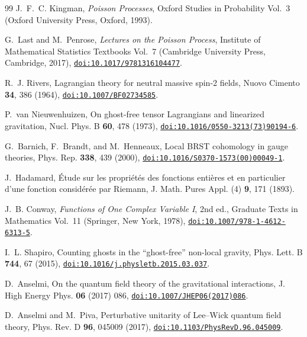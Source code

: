 \documentclass[aps,prd,10pt,twocolumn,superscriptaddress,nofootinbib,floatfix,longbibliography,showpacs,showkeys]{revtex4-2}
\theoremstyle{plain}
\theoremstyle{definition}
\theoremstyle{remark}
\begin{document}
\begin{thebibliography}{99}
J.~F.~C. Kingman, \emph{Poisson Processes}, Oxford Studies in Probability Vol.~3 (Oxford University Press, Oxford, 1993).

G.~Last and M.~Penrose, \emph{Lectures on the Poisson Process}, Institute of Mathematical Statistics Textbooks Vol.~7 (Cambridge University Press, Cambridge, 2017), \href{https://doi.org/10.1017/9781316104477}{\nolinkurl{doi:10.1017/9781316104477}}.

R.~J. Rivers, Lagrangian theory for neutral massive spin-2 fields, Nuovo Cimento \textbf{34}, 386 (1964), \href{https://doi.org/10.1007/BF02734585}{\nolinkurl{doi:10.1007/BF02734585}}.

P.~van Nieuwenhuizen, On ghost-free tensor Lagrangians and linearized gravitation, Nucl. Phys. B \textbf{60}, 478 (1973), \href{https://doi.org/10.1016/0550-3213(73)90194-6}{\nolinkurl{doi:10.1016/0550-3213(73)90194-6}}.

G.~Barnich, F.~Brandt, and M.~Henneaux, Local BRST cohomology in gauge theories, Phys. Rep. \textbf{338}, 439 (2000), \href{https://doi.org/10.1016/S0370-1573(00)00049-1}{\nolinkurl{doi:10.1016/S0370-1573(00)00049-1}}.

J.~Hadamard, \'Etude sur les propri\'et\'es des fonctions enti\`eres et en particulier d'une fonction consid\'er\'ee par Riemann, J. Math. Pures Appl. (4) \textbf{9}, 171 (1893).

J.~B. Conway, \emph{Functions of One Complex Variable I}, 2nd ed., Graduate Texts in Mathematics Vol.~11 (Springer, New York, 1978), \href{https://doi.org/10.1007/978-1-4612-6313-5}{\nolinkurl{doi:10.1007/978-1-4612-6313-5}}.

I.~L. Shapiro, Counting ghosts in the ``ghost-free'' non-local gravity, Phys. Lett. B \textbf{744}, 67 (2015), \href{https://doi.org/10.1016/j.physletb.2015.03.037}{\nolinkurl{doi:10.1016/j.physletb.2015.03.037}}.

D.~Anselmi, On the quantum field theory of the gravitational interactions, J. High Energy Phys. \textbf{06} (2017) 086, \href{https://doi.org/10.1007/JHEP06(2017)086}{\nolinkurl{doi:10.1007/JHEP06(2017)086}}.

D.~Anselmi and M.~Piva, Perturbative unitarity of Lee--Wick quantum field theory, Phys. Rev. D \textbf{96}, 045009 (2017), \href{https://doi.org/10.1103/PhysRevD.96.045009}{\nolinkurl{doi:10.1103/PhysRevD.96.045009}}.


\end{thebibliography}
\end{document}
